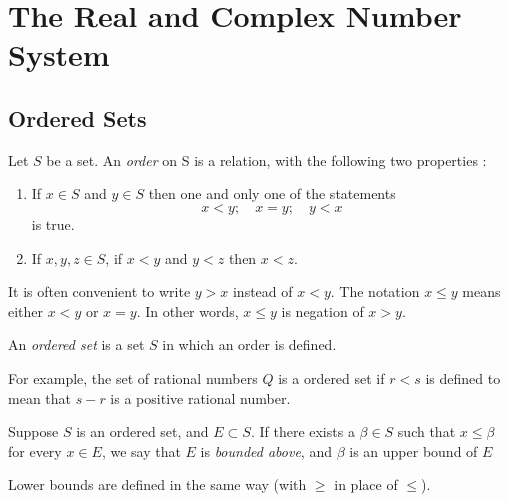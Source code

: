 

\chapter{The Real and Complex Number System}

\bigbreak
\section{Ordered Sets}

\begin{defn}
    \label{ords}
    Let $S$ be a set. An {\it order} on S is a relation, 
    with the following two properties : 
    \begin{enumerate}
        \item If $x \in S$ and $y \in S$ then one and only one of the statements
            $$ x < y ; \quad x = y ; \quad y < x $$
            is true.
        \item If $x, y, z \in S$, if $x < y$ and $y < z$ then $x < z$.
    \end{enumerate}
    It is often convenient to write $y > x$ instead of $x < y$.
    The notation $x \leq y$ means either $x < y$ or  $x = y$. 
    In other words, $x \leq y$ is negation of $x > y$.
\end{defn}

\begin{defn}
    An {\it ordered set} is a set $S$ in which an order is defined.
\end{defn}
For example, the set of rational numbers $Q$ is a ordered set if $r < s$ 
is defined to mean that $s-r$ is a positive rational number.

\begin{defn}
    Suppose $S$ is an ordered set, and $E \subset S$. 
    If there exists a $\beta \in S$ such that $x \leq \beta$ for every $x \in E$, 
    we say that $E$ is {\it bounded above},
    and $\beta$ is an upper bound of $E$
\end{defn}
Lower bounds are defined in the same way (with $\geq$ in place of $\leq$).

